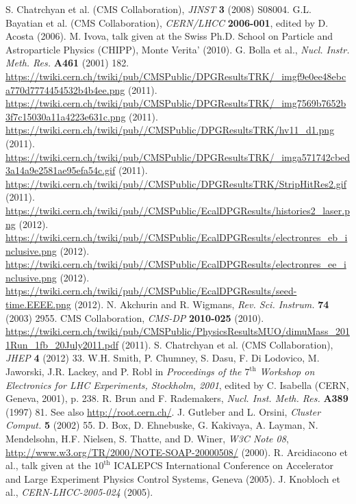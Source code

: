 \documentclass[12pt, letterpaper]{report}
\begin{document}
\begin{thebibliography}{99}
 S. Chatrchyan et al. (CMS Collaboration), \textit{JINST} \textbf{3} (2008) S08004.
 G.L. Bayatian et al. (CMS Collaboration), \textit{CERN/LHCC} \textbf{2006-001}, edited by D. Acosta (2006).
 M. Ivova, talk given at the Swiss Ph.D. School on Particle and Astroparticle Physics (CHIPP), Monte Verita' (2010).
 G. Bolla et al., \textit{Nucl. Instr. Meth. Res.} \textbf{A461} (2001) 182.
 \url{https://twiki.cern.ch/twiki/pub/CMSPublic/DPGResultsTRK/_imgf9e0ee48ebca770d7774454532b4b4ee.png} (2011).
 \url{https://twiki.cern.ch/twiki/pub/CMSPublic/DPGResultsTRK/_img7569b7652b3f7c15030a11a4223e631c.png} (2011).
 \url{https://twiki.cern.ch/twiki/pub//CMSPublic/DPGResultsTRK/hv11_d1.png} (2011).
 \url{https://twiki.cern.ch/twiki/pub/CMSPublic/DPGResultsTRK/_imga571742cbed3a14a9e2581ae95efa54c.gif} (2011).
 \url{https://twiki.cern.ch/twiki/pub//CMSPublic/DPGResultsTRK/StripHitRes2.gif} (2011).
 \url{https://twiki.cern.ch/twiki/pub//CMSPublic/EcalDPGResults/histories2_laser.png} (2012).
 \url{https://twiki.cern.ch/twiki/pub//CMSPublic/EcalDPGResults/electronres_eb_inclusive.png} (2012).
 \url{https://twiki.cern.ch/twiki/pub//CMSPublic/EcalDPGResults/electronres_ee_inclusive.png} (2012).
 \url{https://twiki.cern.ch/twiki/pub//CMSPublic/EcalDPGResults/seed-time.EEEE.png} (2012).
 N. Akchurin and R. Wigmans, \textit{Rev. Sci. Instrum.} \textbf{74} (2003) 2955.
 CMS Collaboration, \textit{CMS-DP} \textbf{2010-025} (2010).
 \url{https://twiki.cern.ch/twiki/pub/CMSPublic/PhysicsResultsMUO/dimuMass_2011Run_1fb_20July2011.pdf} (2011).
 S. Chatrchyan et al. (CMS Collaboration), \textit{JHEP} \textbf{4} (2012) 33.
 W.H. Smith, P. Chumney, S. Dasu, F. Di Lodovico, M. Jaworski, J.R. Lackey, and P. Robl in \textit{Proceedings of the $7^{\mathrm{th}}$ Workshop on Electronics for LHC Experiments, Stockholm, 2001}, edited by C. Isabella (CERN, Geneva, 2001), p. 238.
 R. Brun and F. Rademakers, \textit{Nucl. Inst. Meth. Res.} \textbf{A389} (1997) 81.  See also \url{http://root.cern.ch/}.
 J. Gutleber and L. Orsini, \textit{Cluster Comput.} \textbf{5} (2002) 55.
 D. Box, D. Ehnebuske, G. Kakivaya, A. Layman, N. Mendelsohn, H.F. Nielsen, S. Thatte, and D. Winer, \textit{W3C Note 08}, \url{http://www.w3.org/TR/2000/NOTE-SOAP-20000508/} (2000).
 R. Arcidiacono et al., talk given at the $10^{\mathrm{th}}$ ICALEPCS International Conference on Accelerator and Large Experiment Physics Control Systems, Geneva (2005).
 J. Knobloch et al., \textit{CERN-LHCC-2005-024} (2005).


\end{thebibliography}
\end{document}
